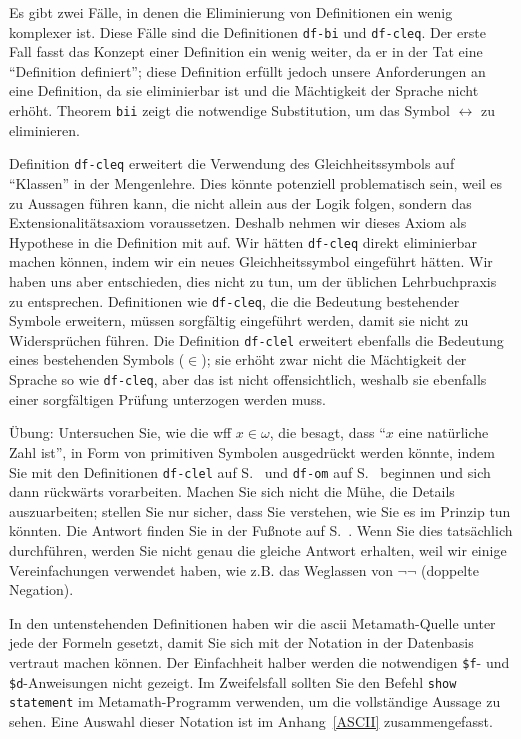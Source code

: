 Es gibt zwei Fälle, in denen die Eliminierung von Definitionen ein wenig komplexer ist.  Diese Fälle sind die Definitionen \texttt{df-bi} und \texttt{df-cleq}.  Der erste Fall fasst das Konzept einer Definition ein wenig weiter, da er in der Tat eine "`Definition definiert"'; diese Definition erfüllt jedoch unsere Anforderungen an eine Definition, da sie eliminierbar ist und die Mächtigkeit der Sprache nicht erhöht.  Theorem \texttt{bii} zeigt die notwendige Substitution, um das Symbol $\leftrightarrow$ zu eliminieren.

Definition \texttt{df-cleq} erweitert die Verwendung des Gleichheitssymbols auf "`Klassen"' in der Mengenlehre.  Dies könnte potenziell problematisch sein, weil es zu Aussagen führen kann, die nicht allein aus der Logik folgen, sondern das Extensionalitätsaxiom voraussetzen. Deshalb nehmen wir dieses Axiom als Hypothese in die Definition mit auf.  Wir hätten \texttt{df-cleq} direkt eliminierbar machen können, indem wir ein neues Gleichheitssymbol eingeführt hätten. Wir haben uns aber entschieden, dies nicht zu tun, um der üblichen Lehrbuchpraxis zu entsprechen.  Definitionen wie \texttt{df-cleq}, die die Bedeutung bestehender Symbole erweitern, müssen sorgfältig eingeführt werden, damit sie nicht zu Widersprüchen führen.  Die Definition \texttt{df-clel} erweitert ebenfalls die Bedeutung eines bestehenden Symbols ($\in$); sie erhöht zwar nicht die Mächtigkeit der Sprache so wie \texttt{df-cleq}, aber das ist nicht offensichtlich, weshalb sie ebenfalls einer sorgfältigen Prüfung unterzogen werden muss.

Übung:  Untersuchen Sie, wie die wff $x\in\omega$, die besagt, dass "`$x$ eine natürliche Zahl ist"', in Form von primitiven Symbolen ausgedrückt werden könnte, indem Sie mit den Definitionen \texttt{df-clel} auf S.~\pageref{dfclel} und \texttt{df-om} auf S.~\pageref{dfom} beginnen und sich dann rückwärts vorarbeiten.  Machen Sie sich nicht die Mühe, die Details auszuarbeiten; stellen Sie nur sicher, dass Sie verstehen, wie Sie es im Prinzip tun könnten. Die Antwort finden Sie in der Fußnote auf S.~\pageref{expandom}.  Wenn Sie dies tatsächlich durchführen, werden Sie nicht genau die gleiche Antwort erhalten, weil wir einige Vereinfachungen verwendet haben, wie z.B. das Weglassen von $\lnot\lnot$ (doppelte Negation).

In den untenstehenden Definitionen haben wir die {\sc ascii} Metamath-Quelle unter jede der Formeln gesetzt, damit Sie sich mit der Notation in der Datenbasis vertraut machen können.  Der Einfachheit halber werden die notwendigen \texttt{\$f}- und \texttt{\$d}-Anweisungen nicht gezeigt.  Im Zweifelsfall sollten Sie den Befehl \texttt{show statement} im Metamath-Programm verwenden, um die vollständige Aussage zu sehen. Eine Auswahl dieser Notation ist im Anhang~\ref{ASCII} zusammengefasst.

